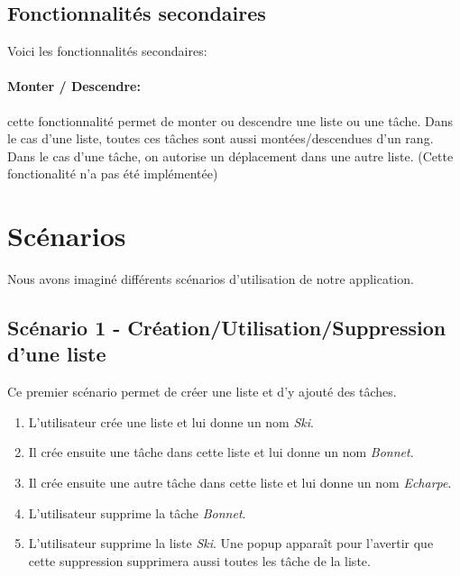 \documentclass[a4paper,10pt]{article}
\begin{document}
\subsection{Fonctionnalités secondaires}
Voici les fonctionnalités secondaires:
\paragraph{Monter / Descendre:} cette fonctionnalité permet de monter ou descendre une liste ou une tâche. Dans le cas d'une liste, toutes ces tâches sont aussi montées/descendues d'un rang. Dans le cas d'une tâche, on autorise un déplacement dans une autre liste. (Cette fonctionalité n'a pas été implémentée)

\newpage
\section{Scénarios}
Nous avons imaginé différents scénarios d'utilisation de notre application.

\subsection{Scénario 1 - Création/Utilisation/Suppression d'une liste}
Ce premier scénario permet de créer une liste et d'y ajouté des tâches.
\begin{enumerate}
\item{L'utilisateur crée une liste et lui donne un nom \textit{Ski}.}
\item{Il crée ensuite une tâche dans cette liste et lui donne un nom \textit{Bonnet}.}
\item{Il crée ensuite une autre tâche dans cette liste et lui donne un nom \textit{Echarpe}.}
\item{L'utilisateur supprime la tâche \textit{Bonnet}.}
\item{L'utilisateur supprime la liste \textit{Ski}. Une popup apparaît pour l'avertir que cette suppression supprimera aussi toutes les tâche de la liste.}
\end{enumerate}
\end{document}
